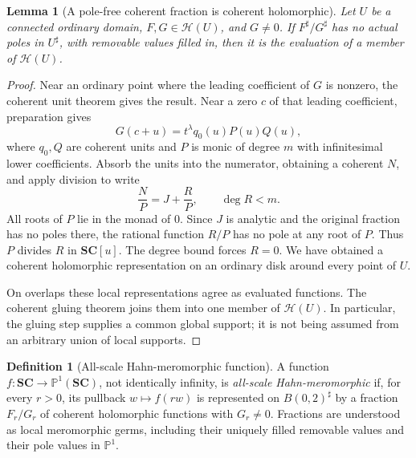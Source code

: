 \documentclass[11pt,letterpaper]{article}
\newtheorem{lemma}[theorem]{Lemma}
\theoremstyle{definition}
\newtheorem{definition}[theorem]{Definition}
\theoremstyle{remark}
\newcommand{\SC}{\mathbf{SC}}
\newcommand{\HH}{\mathcal H}
\newcommand{\sh}{^{\sharp}}
\numberwithin{equation}{section}
\begin{document}
\begin{lemma}[A pole-free coherent fraction is coherent holomorphic]\label{lem:polefree}
Let $U$ be a connected ordinary domain, $F,G\in\HH(U)$, and $G\ne0$. If $F\sh/G\sh$ has no actual poles in $U\sh$, with removable values filled in, then it is the evaluation of a member of $\HH(U)$.
\end{lemma}
\begin{proof}
Near an ordinary point where the leading coefficient of $G$ is nonzero, the coherent unit theorem gives the result. Near a zero $c$ of that leading coefficient, preparation gives
\[
 G(c+u)=t^\lambda q_0(u)P(u)Q(u),
\]
where $q_0,Q$ are coherent units and $P$ is monic of degree $m$ with infinitesimal lower coefficients. Absorb the units into the numerator, obtaining a coherent $N$, and apply division to write
\[
 \frac NP=J+\frac RP,\qquad \deg R<m.
\]
All roots of $P$ lie in the monad of $0$. Since $J$ is analytic and the original fraction has no poles there, the rational function $R/P$ has no pole at any root of $P$. Thus $P$ divides $R$ in $\SC[u]$. The degree bound forces $R=0$. We have obtained a coherent holomorphic representation on an ordinary disk around every point of $U$.

On overlaps these local representations agree as evaluated functions. The coherent gluing theorem joins them into one member of $\HH(U)$. In particular, the gluing step supplies a common global support; it is not being assumed from an arbitrary union of local supports.
\end{proof}

\begin{definition}[All-scale Hahn-meromorphic function]
A function $f:\SC\to\mathbb P^1(\SC)$, not identically infinity, is \emph{all-scale Hahn-meromorphic} if, for every $r>0$, its pullback $w\mapsto f(rw)$ is represented on $B(0,2)\sh$ by a fraction $F_r/G_r$ of coherent holomorphic functions with $G_r\ne0$. Fractions are understood as local meromorphic germs, including their uniquely filled removable values and their pole values in $\mathbb P^1$.
\end{definition}
\end{document}
